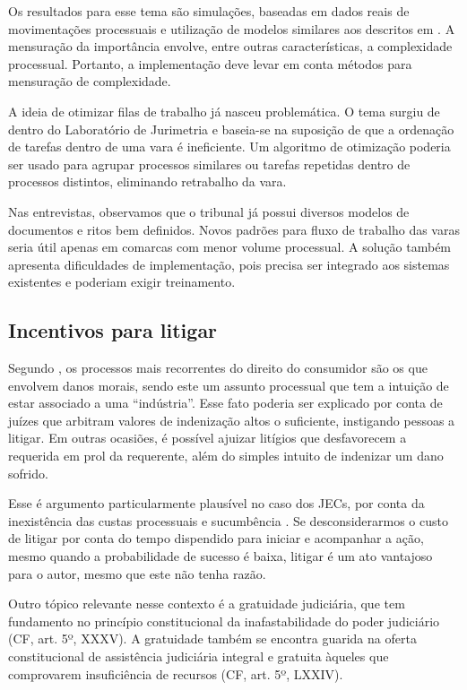 \documentclass[]{report}
\begin{document}
Os resultados para esse tema são simulações, baseadas em dados reais de
movimentações processuais e utilização de modelos similares aos
descritos em \citet{Fossaluza2015}. A mensuração da importância envolve,
entre outras características, a complexidade processual. Portanto, a
implementação deve levar em conta métodos para mensuração de
complexidade.

A ideia de otimizar filas de trabalho já nasceu problemática. O tema
surgiu de dentro do Laboratório de Jurimetria e baseia-se na suposição
de que a ordenação de tarefas dentro de uma vara é ineficiente. Um
algoritmo de otimização poderia ser usado para agrupar processos
similares ou tarefas repetidas dentro de processos distintos, eliminando
retrabalho da vara.

Nas entrevistas, observamos que o tribunal já possui diversos modelos de
documentos e ritos bem definidos. Novos padrões para fluxo de trabalho
das varas seria útil apenas em comarcas com menor volume processual. A
solução também apresenta dificuldades de implementação, pois precisa ser
integrado aos sistemas existentes e poderiam exigir treinamento.

\subsection{Incentivos para litigar}\label{incentivos-para-litigar}

Segundo \citet{CNJ2015}, os processos mais recorrentes do direito do
consumidor são os que envolvem danos morais, sendo este um assunto
processual que tem a intuição de estar associado a uma ``indústria''.
Esse fato poderia ser explicado por conta de juízes que arbitram valores
de indenização altos o suficiente, instigando pessoas a litigar. Em
outras ocasiões, é possível ajuizar litígios que desfavorecem a
requerida em prol da requerente, além do simples intuito de indenizar um
dano sofrido.

Esse é argumento particularmente plausível no caso dos JECs, por conta
da inexistência das custas processuais e sucumbência \citep{Athos2015}.
Se desconsiderarmos o custo de litigar por conta do tempo dispendido
para iniciar e acompanhar a ação, mesmo quando a probabilidade de
sucesso é baixa, litigar é um ato vantajoso para o autor, mesmo que este
não tenha razão.

Outro tópico relevante nesse contexto é a gratuidade judiciária, que tem
fundamento no princípio constitucional da inafastabilidade do poder
judiciário (CF, art. 5º, XXXV). A gratuidade também se encontra guarida
na oferta constitucional de assistência judiciária integral e gratuita
àqueles que comprovarem insuficiência de recursos (CF, art. 5º, LXXIV).
\end{document}
